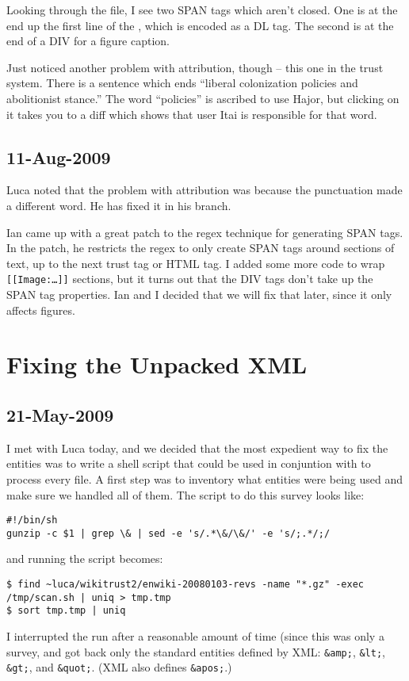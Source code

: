 Looking through the file, I see two SPAN tags which aren't closed.
One is at the end up the first line of the ,
which is encoded as a DL tag.
The second is at the end of a DIV for a figure caption.

Just noticed another problem with attribution, though -- this
one in the trust system.
There is a sentence which ends ``liberal colonization policies and
abolitionist stance.''
The word ``policies'' is ascribed to use Hajor, but
clicking on it takes you to a diff which shows that
user Itai is responsible for that word.

\subsection{11-Aug-2009}

Luca noted that the problem with attribution was because the
punctuation made a different word.
He has fixed it in his branch.

Ian came up with a great patch to the regex technique for
generating SPAN tags.
In the patch, he restricts the regex to only create SPAN tags
around sections of text, up to the next trust tag or HTML tag.
I added some more code to wrap \texttt{[[Image:\ldots]]} sections,
but it turns out that the DIV tags don't take up the SPAN tag properties.
Ian and I decided that we will fix that later, since it only affects figures.

\section{Fixing the Unpacked XML}

\subsection{21-May-2009}
\label{sec:origin-fixxml}

I met with Luca today, and we decided that the most expedient
way to fix the entities was to write a shell script that could
be used in conjuntion with  to process every file.
A first step was to inventory what entities were being used and
make sure we handled all of them.
The script to do this survey looks like:
\begin{verbatim}
#!/bin/sh
gunzip -c $1 | grep \& | sed -e 's/.*\&/\&/' -e 's/;.*/;/
\end{verbatim}
and running the script becomes:
\begin{verbatim}
$ find ~luca/wikitrust2/enwiki-20080103-revs -name "*.gz" -exec /tmp/scan.sh | uniq > tmp.tmp
$ sort tmp.tmp | uniq
\end{verbatim}
I interrupted the run after a reasonable amount of time (since this
was only a survey, and got back only the standard entities defined by
XML: \texttt{\&amp;}, \texttt{\&lt;}, \texttt{\&gt;}, and \texttt{\&quot;}.
(XML also defines \texttt{\&apos;}.)

